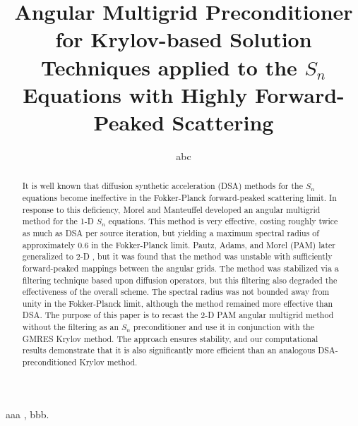\documentclass[preprint,10pt]{elsarticle}
\renewcommand{\(}{\left(}
\renewcommand{\)}{\right)}
\renewcommand{\[}{\left[}
\renewcommand{\]}{\right]}
\begin{document}
\begin{frontmatter}



\title{Angular Multigrid Preconditioner for Krylov-based Solution Techniques
applied to the $S_n$ Equations with Highly Forward-Peaked Scattering}
\author{abc} 

\begin{abstract}
It is well known that diffusion synthetic acceleration (DSA) methods for the
$S_n$ equations become ineffective in the Fokker-Planck forward-peaked
scattering limit. In response to this deficiency, Morel and Manteuffel
\cite{multigrid_1d} developed an angular multigrid method for the 1-D $S_n$
equations. This method is very effective, costing roughly twice as much as DSA
per source iteration, but yielding a maximum spectral radius of approximately
$0.6$ in the Fokker-Planck limit. Pautz, Adams, and Morel (PAM) later
generalized to 2-D \cite{multigrid_2d}, but it was found that the method was
unstable with sufficiently forward-peaked mappings between the angular grids.
The method was stabilized via a filtering technique based upon diffusion
operators, but this filtering also degraded the effectiveness of the overall
scheme. The spectral radius was not bounded away from unity in the
Fokker-Planck limit, although the method remained more effective than DSA. The
purpose of this paper is to recast the 2-D PAM angular multigrid method
without the filtering as an $S_n$ preconditioner and use it in conjunction
with the GMRES Krylov method. The approach ensures stability, and our
computational results demonstrate that it is also significantly more efficient
than an analogous DSA-preconditioned Krylov method.
\end{abstract}

\begin{keyword}
aaa \sep
bbb.
\end{keyword}
\end{frontmatter}
\end{document}
